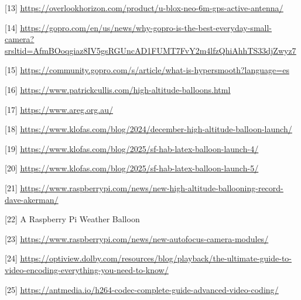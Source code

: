 \documentclass[12pt,a4paper]{article}
\begin{document}
{[}13{]} \href{https://overlookhorizon.com/product/u-blox-neo-6m-gps-active-antenna/}{\ul{https://overlookhorizon.com/product/u-blox-neo-6m-gps-active-antenna/}}

{[}14{]} \href{https://gopro.com/en/us/news/why-gopro-is-the-best-everyday-small-camera?srsltid=AfmBOoqgiaz8IV5gsRGUncAD1FUMT7FvY2m4lfzQhiAhhTS33djZwyz7}{\ul{https://gopro.com/en/us/news/why-gopro-is-the-best-everyday-small-camera?srsltid=AfmBOoqgiaz8IV5gsRGUncAD1FUMT7FvY2m4lfzQhiAhhTS33djZwyz7}}

{[}15{]} \href{https://community.gopro.com/s/article/what-is-hypersmooth?language=es}{\ul{https://community.gopro.com/s/article/what-is-hypersmooth?language=es}}

{[}16{]} \href{https://www.patrickcullis.com/high-altitude-balloons.html}{\ul{https://www.patrickcullis.com/high-altitude-balloons.html}}

{[}17{]} \href{https://www.areg.org.au/}{\ul{https://www.areg.org.au/}}

{[}18{]} \href{https://www.klofas.com/blog/2024/december-high-altitude-balloon-launch/}{\ul{https://www.klofas.com/blog/2024/december-high-altitude-balloon-launch/}}

{[}19{]} \href{https://www.klofas.com/blog/2025/sf-hab-latex-balloon-launch-4/}{\ul{https://www.klofas.com/blog/2025/sf-hab-latex-balloon-launch-4/}}

{[}20{]} \href{https://www.klofas.com/blog/2025/sf-hab-latex-balloon-launch-5/}{\ul{https://www.klofas.com/blog/2025/sf-hab-latex-balloon-launch-5/}}

{[}21{]} \href{https://www.raspberrypi.com/news/new-high-altitude-ballooning-record-dave-akerman/}{\ul{https://www.raspberrypi.com/news/new-high-altitude-ballooning-record-dave-akerman/}}

{[}22{]} A Raspberry Pi Weather Balloon

{[}23{]} \href{https://www.raspberrypi.com/news/new-autofocus-camera-modules/}{\ul{https://www.raspberrypi.com/news/new-autofocus-camera-modules/}}

{[}24{]} \href{https://optiview.dolby.com/resources/blog/playback/the-ultimate-guide-to-video-encoding-everything-you-need-to-know/}{\ul{https://optiview.dolby.com/resources/blog/playback/the-ultimate-guide-to-video-encoding-everything-you-need-to-know/}}

{[}25{]} \href{https://antmedia.io/h264-codec-complete-guide-advanced-video-coding/}{\ul{https://antmedia.io/h264-codec-complete-guide-advanced-video-coding/}}
\end{document}
